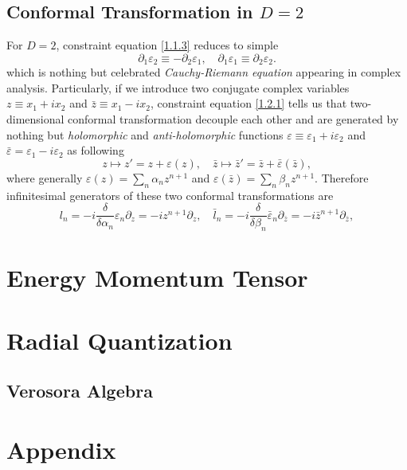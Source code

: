\documentclass[10pt,nofootinbib]{revtex4}
\begin{document}
	\subsection{Conformal Transformation in $D=2$}
		For $D=2$, constraint equation \eqref{1.1.3} reduces to simple
		\begin{equation}\label{1.2.1}
			\partial_1 \varepsilon_2\equiv-\partial_2 \varepsilon_1,\quad \partial_1 \varepsilon_1\equiv \partial_2 \varepsilon_2.
		\end{equation}
		which is nothing but celebrated \emph{Cauchy-Riemann equation} appearing in complex analysis. Particularly, if we introduce two conjugate complex variables $z\equiv x_1+ix_2$ and $\bar z\equiv x_1-i x_2$, constraint equation \eqref{1.2.1} tells us that two-dimensional conformal transformation decouple each other and are generated by nothing but \emph{holomorphic} and \emph{anti-holomorphic} functions $\varepsilon\equiv \varepsilon_1+i\varepsilon_2$ and $\bar \varepsilon=\varepsilon_1-i \varepsilon_2$ as following
		\begin{equation*}
			z\mapsto z'= z+\varepsilon(z),\quad \bar z\mapsto \bar z'=\bar z+\bar\varepsilon(\bar z),
		\end{equation*}
		where generally $\varepsilon(z)=\sum_n\alpha_n z^{n+1}$ and $\varepsilon(\bar z)=\sum_n\beta_n z^{n+1}$. Therefore infinitesimal generators of these two conformal transformations are
		\begin{equation}\label{1.2.2}
			l_n=-i\dfrac{\delta}{\delta \alpha_n}\varepsilon_n \partial_z=-iz^{n+1}\partial_z,\quad\bar l_n=-i\dfrac{\delta}{\delta \beta_n}\bar\varepsilon_n \partial_{\bar z}=-i\bar z^{n+1}\partial_{\bar z},
		\end{equation}
		
\section{Energy Momentum Tensor}

\section{Radial Quantization}
	\subsection{Verosora Algebra}

\section{Appendix}
\end{document}
